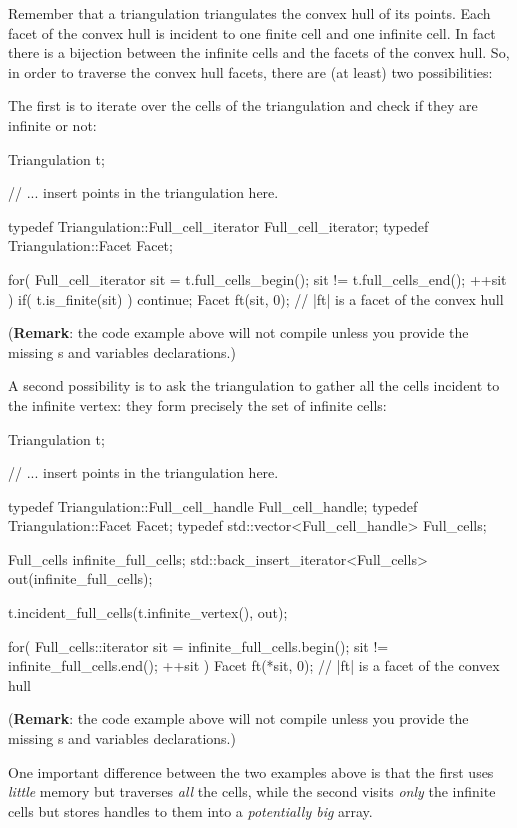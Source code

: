 {{Remember that a triangulation triangulates the convex hull of its points. Each
facet of the convex hull is incident to one finite cell and one infinite
cell. In fact there is a bijection between the infinite cells and the
facets of the convex hull. So, in order to traverse the convex hull facets,
there are (at least) two possibilities:

The first is to iterate over the cells of the triangulation and check if they
are infinite or not:

\begin{ccExampleCode}
Triangulation t;

// ... insert points in the triangulation here.

typedef Triangulation::Full_cell_iterator Full_cell_iterator;
typedef Triangulation::Facet Facet;

for( Full_cell_iterator sit = t.full_cells_begin(); sit != t.full_cells_end(); ++sit )
{
    if( t.is_finite(sit) )
        continue;
    Facet ft(sit, 0); // |ft| is a facet of the convex hull
}
\end{ccExampleCode}
(\textbf{Remark}: the code example above will not compile unless you provide
the missing s and variables declarations.)

A second possibility is to ask the triangulation to gather all the cells
incident to the infinite vertex: they form precisely the set of infinite
cells:

\begin{ccExampleCode}
Triangulation t;

// ... insert points in the triangulation here.

typedef Triangulation::Full_cell_handle Full_cell_handle;
typedef Triangulation::Facet Facet;
typedef std::vector<Full_cell_handle> Full_cells;

Full_cells infinite_full_cells;
std::back_insert_iterator<Full_cells> out(infinite_full_cells);

t.incident_full_cells(t.infinite_vertex(), out);

for( Full_cells::iterator sit = infinite_full_cells.begin(); sit != infinite_full_cells.end(); ++sit )
{
    Facet ft(*sit, 0); // |ft| is a facet of the convex hull
}
\end{ccExampleCode}
(\textbf{Remark}: the code example above will not compile unless you provide
the missing s and variables declarations.)

One important difference between the two examples above is that the first uses
\emph{little} memory but traverses \emph{all} the cells, while the second
visits \emph{only} the infinite cells but stores handles to them into a
\emph{potentially big} array.

}}
